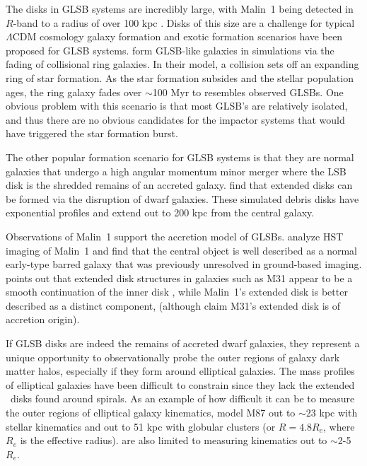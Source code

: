 \documentclass{emulateapj}
\newcommand\HI{\ion{H}{1}}
\begin{document}
The disks in GLSB systems are incredibly large, with Malin~1 being detected in $R$-band to a radius of over 100 kpc \citep{Moore06}.  Disks of this size are a challenge for typical $\Lambda$CDM cosmology galaxy formation and exotic formation scenarios have been proposed for GLSB systems.  \citet{Mapelli08} form GLSB-like galaxies in simulations via the fading of collisional ring galaxies.  In their model, a collision sets off an expanding ring of star formation.  As the star formation subsides and the stellar population ages, the ring galaxy fades over $\sim$100 Myr to resembles observed GLSBs.  One obvious problem with this scenario is that most GLSB's are relatively isolated, and thus there are no obvious candidates for the impactor systems that would have triggered the star formation burst.  

The other popular formation scenario for GLSB systems is that they are normal galaxies that undergo a high angular momentum minor merger where the LSB disk is the shredded remains of an accreted galaxy.  \citet{Pen06} find that extended disks can be formed via the disruption of dwarf galaxies.  These simulated debris disks have exponential profiles and extend out to 200 kpc from the central galaxy.

Observations of Malin~1 support the accretion model of GLSBs.  \citet{Barth07} analyze HST imaging of Malin~1 and find that the central object is well described as a normal early-type barred galaxy that was previously unresolved in ground-based imaging. \citet{Barth07} points out that extended disk structures in galaxies such as M31 appear to be a smooth continuation of the inner disk \citep{Ferguson02}, while Malin~1's extended disk is better described as a distinct component, (although \citet{Ibata05} claim M31's extended disk is of accretion origin).


If GLSB disks are indeed the remains of accreted dwarf galaxies, they represent a unique opportunity to observationally probe the outer regions of galaxy dark matter halos, especially if they form around elliptical galaxies.  The mass profiles of elliptical galaxies have been difficult to constrain since they lack the extended \HI\ disks found around spirals.  As an example of how difficult it can be to measure the outer regions of elliptical galaxy kinematics, \citet{Murphy2011} model M87 out to $\sim$23 kpc with stellar kinematics and out to 51 kpc with globular clusters (or $R=4.8 R_e$, where $R_e$ is the effective radius). \citet{Raskutti14} are also limited to measuring kinematics out to $\sim$2-5 $R_e$.  
\end{document}

